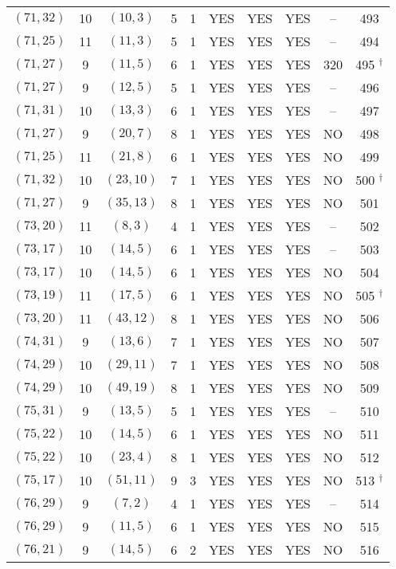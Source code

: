 \begin{longtable}{|c|c|c|c|c|c|c|c|c|c|}
$(71, 32)$ & 10 & $(10, 3)$ & 5 & 1 & YES & YES & YES & -- & 493\\
$(71, 25)$ & 11 & $(11, 3)$ & 5 & 1 & YES & YES & YES & -- & 494\\
$(71, 27)$ & 9 & $(11, 5)$ & 6 & 1 & YES & YES & YES & 320 & 495 ${}^\dagger$\\
$(71, 27)$ & 9 & $(12, 5)$ & 5 & 1 & YES & YES & YES & -- & 496\\
$(71, 31)$ & 10 & $(13, 3)$ & 6 & 1 & YES & YES & YES & -- & 497\\
$(71, 27)$ & 9 & $(20, 7)$ & 8 & 1 & YES & YES & YES & NO & 498\\
$(71, 25)$ & 11 & $(21, 8)$ & 6 & 1 & YES & YES & YES & NO & 499\\
$(71, 32)$ & 10 & $(23, 10)$ & 7 & 1 & YES & YES & YES & NO & 500 ${}^\dagger$\\
$(71, 27)$ & 9 & $(35, 13)$ & 8 & 1 & YES & YES & YES & NO & 501\\
$(73, 20)$ & 11 & $(8, 3)$ & 4 & 1 & YES & YES & YES & -- & 502\\
$(73, 17)$ & 10 & $(14, 5)$ & 6 & 1 & YES & YES & YES & -- & 503\\
$(73, 17)$ & 10 & $(14, 5)$ & 6 & 1 & YES & YES & YES & NO & 504\\
$(73, 19)$ & 11 & $(17, 5)$ & 6 & 1 & YES & YES & YES & NO & 505 ${}^\dagger$\\
$(73, 20)$ & 11 & $(43, 12)$ & 8 & 1 & YES & YES & YES & NO & 506\\
$(74, 31)$ & 9 & $(13, 6)$ & 7 & 1 & YES & YES & YES & NO & 507\\
$(74, 29)$ & 10 & $(29, 11)$ & 7 & 1 & YES & YES & YES & NO & 508\\
$(74, 29)$ & 10 & $(49, 19)$ & 8 & 1 & YES & YES & YES & NO & 509\\
$(75, 31)$ & 9 & $(13, 5)$ & 5 & 1 & YES & YES & YES & -- & 510\\
$(75, 22)$ & 10 & $(14, 5)$ & 6 & 1 & YES & YES & YES & NO & 511\\
$(75, 22)$ & 10 & $(23, 4)$ & 8 & 1 & YES & YES & YES & NO & 512\\
$(75, 17)$ & 10 & $(51, 11)$ & 9 & 3 & YES & YES & YES & NO & 513 ${}^\dagger$\\
$(76, 29)$ & 9 & $(7, 2)$ & 4 & 1 & YES & YES & YES & -- & 514\\
$(76, 29)$ & 9 & $(11, 5)$ & 6 & 1 & YES & YES & YES & NO & 515\\
$(76, 21)$ & 9 & $(14, 5)$ & 6 & 2 & YES & YES & YES & NO & 516\\

\end{longtable}
